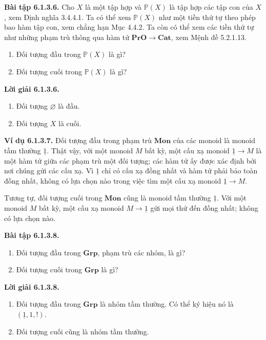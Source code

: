 \noindent\textbf{Bài tập 6.1.3.6.} Cho $X$ là một tập hợp và $\mathbb P(X)$ là tập hợp các tập con của $X$, xem Định nghĩa 3.4.4.1. Ta có thể xem $\mathbb P(X)$ như một tiền thứ tự theo phép bao hàm tập con, xem chẳng hạn Mục 4.4.2. Ta còn có thể xem các tiền thứ tự như những phạm trù thông qua hàm tử $\mathbf{PrO}\to\mathbf{Cat}$, xem Mệnh đề 5.2.1.13.
\begin{enumerate}[label=\alph*.]\item Đối tượng đầu trong $\mathbb P(X)$ là gì?\item Đối tượng cuối trong $\mathbb P(X)$ là gì?\end{enumerate}
\noindent\textbf{Lời giải 6.1.3.6.}\keepwithnext
\begin{enumerate}[label=\alph*.]\item Đối tượng $\varnothing$ là đầu.\item Đối tượng $X$ là cuối.\end{enumerate}

\noindent\textbf{Ví dụ 6.1.3.7.} Đối tượng đầu trong phạm trù $\mathbf{Mon}$ của các monoid là monoid tầm thường $\underline1$. Thật vậy, với một monoid $M$ bất kỳ, một cấu xạ monoid $\underline1\to M$ là một hàm tử giữa các phạm trù một đối tượng; các hàm tử ấy được xác định bởi nơi chúng gửi các cấu xạ. Vì $\underline1$ chỉ có cấu xạ đồng nhất và hàm tử phải bảo toàn đồng nhất, không có lựa chọn nào trong việc tìm một cấu xạ monoid $\underline1\to M$.

Tương tự, đối tượng cuối trong $\mathbf{Mon}$ cũng là monoid tầm thường $\underline1$. Với một monoid $M$ bất kỳ, một cấu xạ monoid $M\to\underline1$ gửi mọi thứ đến đồng nhất; không có lựa chọn nào.

\noindent\textbf{Bài tập 6.1.3.8.}\keepwithnext
\begin{enumerate}[label=\alph*.]\item Đối tượng đầu trong $\mathbf{Grp}$, phạm trù các nhóm, là gì?\item Đối tượng cuối trong $\mathbf{Grp}$ là gì?\end{enumerate}
\noindent\textbf{Lời giải 6.1.3.8.}\keepwithnext
\begin{enumerate}[label=\alph*.]\item Đối tượng đầu trong $\mathbf{Grp}$ là nhóm tầm thường. Có thể ký hiệu nó là $(\underline1,1,!)$.\item Đối tượng cuối cũng là nhóm tầm thường.\end{enumerate}

